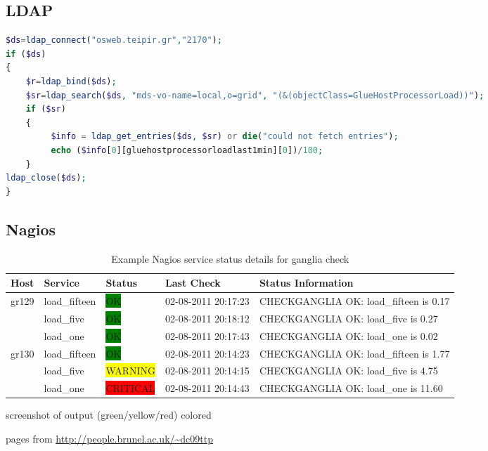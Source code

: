 \subsection{LDAP}

\begin{lstlisting}[language=PHP,caption=PHP LDAP call to BDII]
$ds=ldap_connect("osweb.teipir.gr","2170");
if ($ds)
{
    $r=ldap_bind($ds);
    $sr=ldap_search($ds, "mds-vo-name=local,o=grid", "(&(objectClass=GlueHostProcessorLoad))");
    if ($sr)
    {
         $info = ldap_get_entries($ds, $sr) or die("could not fetch entries");
         echo ($info[0][gluehostprocessorloadlast1min][0])/100;
    }
ldap_close($ds);
}
\end{lstlisting}
\newpage
\subsection{Nagios}
\begin{table}[ht]
\small\addtolength{\tabcolsep}{-3pt}
\begin{tabular}{ | l | l | l | l | l |}
\hline
 Host & Service & Status & Last Check & Status Information \\ \hline
 gr129 & load\_fifteen & \colorbox{green}{OK} & 02-08-2011 20:17:23 & CHECKGANGLIA OK: load\_fifteen is 0.17 \\
\hline
  & load\_five & \colorbox{green}{OK} & 02-08-2011 20:18:12 & CHECKGANGLIA OK: load\_five is 0.27 \\
\hline
  & load\_one & \colorbox{green}{OK} & 02-08-2011 20:17:43 & CHECKGANGLIA OK: load\_one is 0.02 \\
\hline
 gr130 & load\_fifteen & \colorbox{green}{OK} & 02-08-2011 20:14:23 & CHECKGANGLIA OK: load\_fifteen is 1.77 \\
\hline
  & load\_five & \colorbox{yellow}{WARNING} & 02-08-2011 20:14:15 & CHECKGANGLIA OK: load\_five is 4.75 \\
\hline
 & load\_one & \colorbox{red}{CRITICAL} & 02-08-2011 20:14:43 & CHECKGANGLIA OK: load\_one is 11.60 \\
\hline
\end{tabular}
\caption{Example Nagios service status details for ganglia check}
\label{tab:nagios_service_detail}
\end{table}

screenshot of output (green/yellow/red) colored

\newpage

pages from \url{http://people.brunel.ac.uk/~dc09ttp}

\newpage
